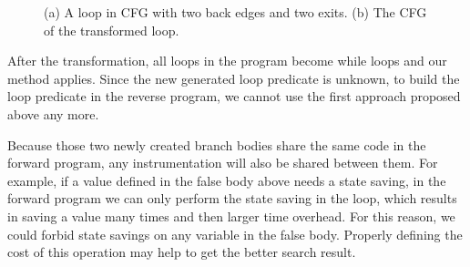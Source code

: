 \begin{figure}%
\caption{(a) A loop in CFG with two back edges and two exits. (b) The CFG of the transformed loop.}
\label{fig:loop}
\end{figure}

After the transformation, all loops in the program become while loops and our method applies.
Since the new generated loop predicate  is unknown, to build the loop predicate  in the reverse program, we cannot use the first approach proposed above any more. %

Because those two newly created branch bodies share the same code in the forward program,  any instrumentation will also be shared between them. 
For example, if a value defined in the false body above needs a state saving, in the forward program we can only perform the state saving in the loop, which results in saving a value many times and then larger time overhead. 
For this reason, we could forbid state savings on any variable in the false body.
Properly defining the cost of this operation may help to get the better search result. 

